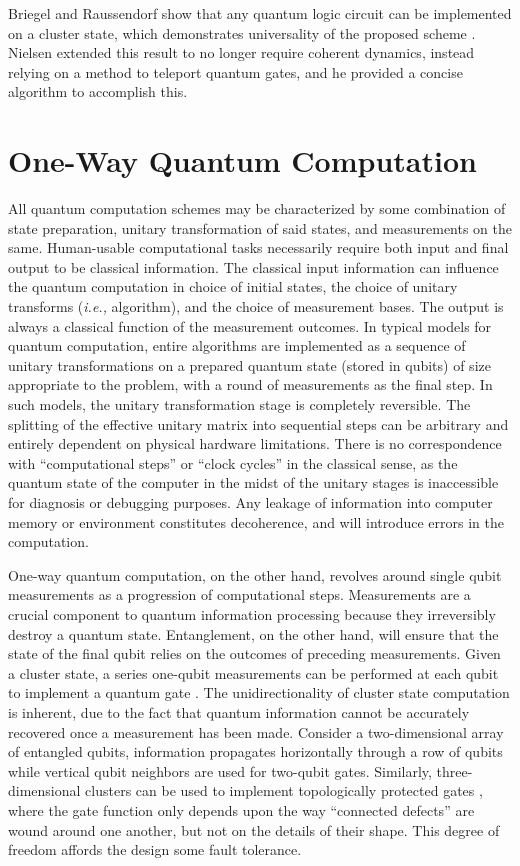 \documentclass[twocolumn]{Styles/IEEEtran11}
\newcommand{\ie}{{\it i.e., }}
\begin{document}
Briegel and Raussendorf show that any quantum logic circuit can be implemented on a cluster state, which demonstrates universality of the proposed scheme \cite{briegel2000measurements}. Nielsen \cite{nielsen108020universal} extended this result to no longer require coherent dynamics, instead relying on a method to teleport quantum gates, and he provided a concise algorithm to accomplish this. 

\section{One-Way Quantum Computation}
All quantum computation schemes may be characterized by some combination of state preparation, unitary transformation of said states, and measurements on the same. Human-usable computational tasks necessarily require both input and final output to be classical information. The classical input information can influence the quantum computation in choice of initial states, the choice of unitary transforms (\ie algorithm), and the choice of measurement bases. The output is always a classical function of the measurement outcomes. In typical models for quantum computation, entire algorithms are implemented as a sequence of unitary transformations on a prepared quantum state (stored in qubits) of size appropriate to the problem, with a round of measurements as the final step. In such models, the unitary transformation stage is completely reversible. The splitting of the effective unitary matrix into sequential steps can be arbitrary and entirely dependent on physical hardware limitations. There is no correspondence with ``computational steps'' or ``clock cycles'' in the classical sense, as the quantum state of the computer in the midst of the unitary stages is inaccessible for diagnosis or debugging purposes. Any leakage of information into computer memory or environment constitutes decoherence, and will introduce errors in the computation.


One-way quantum computation, on the other hand, revolves around single qubit measurements as a progression of computational steps. Measurements are a crucial component to quantum information processing because they irreversibly destroy a quantum state. Entanglement, on the other hand, will ensure that the state of the final qubit relies on the outcomes of preceding measurements. Given a cluster state, a series one-qubit measurements can be performed at each qubit to implement a quantum gate \cite{jorrand2005unifying}.  The unidirectionality of cluster state computation is inherent, due to the fact that quantum information cannot be accurately recovered once a measurement has been made. Consider a two-dimensional array of entangled qubits, information propagates horizontally through a row of qubits while vertical qubit neighbors are used for two-qubit gates. Similarly, three-dimensional clusters can be used to implement topologically protected gates \cite{raussendorf2007topological}, where the gate function only depends upon the way ``connected defects'' are wound around one another, but not on the details of their shape. This degree of freedom affords the design some fault tolerance.
\end{document}
